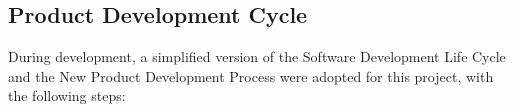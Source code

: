 \documentclass{article}
\begin{document}
\begin{figure}[h]
\end{figure}

\subsection{Product Development Cycle}

During development, a simplified version of the Software Development Life Cycle and the New Product Development Process were adopted for this project, with the following steps:
\end{document}

